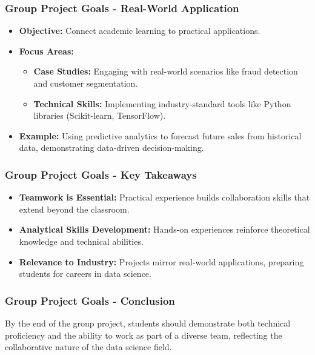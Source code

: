 \documentclass[aspectratio=169]{beamer}
\begin{document}
\begin{frame}[fragile]
    \frametitle{Group Project Goals - Real-World Application}
    \begin{itemize}
        \item \textbf{Objective:} Connect academic learning to practical applications.
        \item \textbf{Focus Areas:}
            \begin{itemize}
                \item \textbf{Case Studies:} Engaging with real-world scenarios like fraud detection and customer segmentation.
                \item \textbf{Technical Skills:} Implementing industry-standard tools like Python libraries (Scikit-learn, TensorFlow).
            \end{itemize}
        \item \textbf{Example:} Using predictive analytics to forecast future sales from historical data, demonstrating data-driven decision-making.
    \end{itemize}
\end{frame}

\begin{frame}[fragile]
    \frametitle{Group Project Goals - Key Takeaways}
    \begin{itemize}
        \item \textbf{Teamwork is Essential:} Practical experience builds collaboration skills that extend beyond the classroom.
        \item \textbf{Analytical Skills Development:} Hands-on experiences reinforce theoretical knowledge and technical abilities.
        \item \textbf{Relevance to Industry:} Projects mirror real-world applications, preparing students for careers in data science.
    \end{itemize}
\end{frame}

\begin{frame}[fragile]
    \frametitle{Group Project Goals - Conclusion}
    By the end of the group project, students should demonstrate both technical proficiency and the ability to work as part of a diverse team, reflecting the collaborative nature of the data science field.
\end{frame}
\end{document}
